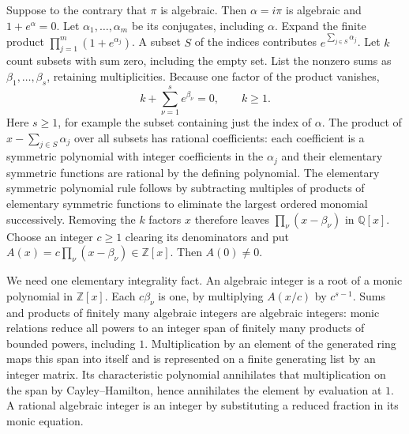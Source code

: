 \documentclass[11pt,a4paper]{article}
\begin{document}
Suppose to the contrary that \(\pi\) is algebraic. Then \(\alpha=i\pi\) is algebraic and \(1+e^\alpha=0\). Let \(\alpha_1,\ldots,\alpha_m\) be its conjugates, including \(\alpha\). Expand the finite product \(\prod_{j=1}^m (1+e^{\alpha_j})\). A subset \(S\) of the indices contributes \(e^{\sum_{j\in S}\alpha_j}\). Let \(k\) count subsets with sum zero, including the empty set. List the nonzero sums as \(\beta_1,\ldots,\beta_s\), retaining multiplicities. Because one factor of the product vanishes, \[
 k+\sum_{\nu=1}^s e^{\beta_\nu}=0,\qquad k\ge1 .
\] Here \(s\ge1\), for example the subset containing just the index of \(\alpha\). The product of \(x-\sum_{j\in S}\alpha_j\) over all subsets has rational coefficients: each coefficient is a symmetric polynomial with integer coefficients in the \(\alpha_j\) and their elementary symmetric functions are rational by the defining polynomial. The elementary symmetric polynomial rule follows by subtracting multiples of products of elementary symmetric functions to eliminate the largest ordered monomial successively. Removing the \(k\) factors \(x\) therefore leaves \(\prod_\nu(x-\beta_\nu)\) in \(\mathbb Q[x]\). Choose an integer \(c\ge1\) clearing its denominators and put \(A(x)=c\prod_\nu(x-\beta_\nu)\in\mathbb Z[x]\). Then \(A(0)\ne0\).

We need one elementary integrality fact. An algebraic integer is a root of a monic polynomial in \(\mathbb Z[x]\). Each \(c\beta_\nu\) is one, by multiplying \(A(x/c)\) by \(c^{s-1}\). Sums and products of finitely many algebraic integers are algebraic integers: monic relations reduce all powers to an integer span of finitely many products of bounded powers, including \(1\). Multiplication by an element of the generated ring maps this span into itself and is represented on a finite generating list by an integer matrix. Its characteristic polynomial annihilates that multiplication on the span by Cayley--Hamilton, hence annihilates the element by evaluation at \(1\). A rational algebraic integer is an integer by substituting a reduced fraction in its monic equation.
\end{document}

